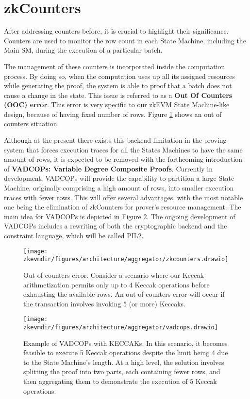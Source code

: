 \section{zkCounters}

After addressing counters before, it is crucial to highlight their significance. Counters are used to monitor the row count in each State Machine, including the Main SM, during the execution of a particular batch.

The management of these counters is incorporated inside the computation process. By doing so, when the computation uses up all its assigned resources while generating the proof, the system is able to proof that a batch does not cause a change in the state. This issue is referred to as a \textbf{Out Of Counters (OOC) error}. This error is very specific to our zkEVM State Machine-like design, because of having fixed number of rows. Figure \ref{fig:ooc-error} shows an out of counters situation.

Although at the present there exists this backend limitation in the proving system that forces execution traces for all the States Machines to have the same amount of rows, it is expected to be removed with the forthcoming introduction of \textbf{VADCOPs: Variable Degree Composite Proofs}. Currently in development, VADCOPs will provide the capability to partition a large State Machine, originally comprising a high amount of rows, into smaller execution traces with fewer rows. This will offer several advantages, with the most notable one being the elimination of zkCounters for prover's resource management. The main idea for VADCOPs is depicted in Figure \ref{fig:vadcops}. The ongoing development of VADCOPs includes a rewriting of both the cryptographic backend and the constraint language, which will be called PIL2.


\begin{figure}[h]
\centering
\texttt{[image: \\zkevmdir/figures/architecture/aggregator/zkcounters.drawio]}
\caption{Out of counters error. Consider a scenario where our Keccak arithmetization permits only up to $4$ Keccak operations before exhausting the available rows. An out of counters error will occur if the transaction involves invoking $5$ (or more) Keccaks.
}
\label{fig:ooc-error}
\end{figure}

\begin{figure}[h]
\centering
\texttt{[image: \\zkevmdir/figures/architecture/aggregator/vadcops.drawio]}
\caption{Example of VADCOPs with KECCAKs. In this scenario, it becomes feasible to execute 5 Keccak operations despite the limit being 4 due to the State Machine's length. At a high level, the solution involves splitting the proof into two parts, each containing fewer rows, and then aggregating them to demonstrate the execution of $5$ Keccak operations.}
\label{fig:vadcops}
\end{figure}






